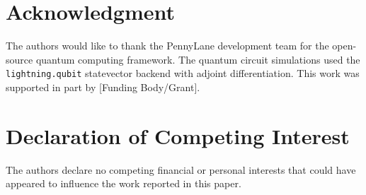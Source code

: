\documentclass[journal]{IEEEtran}
\begin{document}
\section*{Acknowledgment}
The authors would like to thank the PennyLane development team for the open-source quantum computing framework. The quantum circuit simulations used the \texttt{lightning.qubit} statevector backend with adjoint differentiation. This work was supported in part by [Funding Body/Grant].

\section*{Declaration of Competing Interest}
The authors declare no competing financial or personal interests that could have appeared to influence the work reported in this paper.
\end{document}

